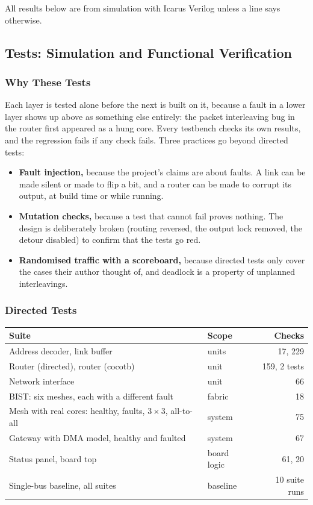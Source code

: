 \documentclass[11pt,a4paper]{article}
\begin{document}
All results below are from simulation with Icarus Verilog unless a line says
otherwise.

\subsection{Tests: Simulation and Functional Verification}

\subsubsection{Why These Tests}

Each layer is tested alone before the next is built on it, because a fault in
a lower layer shows up above as something else entirely: the packet
interleaving bug in the router first appeared as a hung core. Every testbench
checks its own results, and the regression fails if any check fails. Three
practices go beyond directed tests:
\begin{itemize}
\item \textbf{Fault injection,} because the project's claims are about
faults. A link can be made silent or made to flip a bit, and a router can be
made to corrupt its output, at build time or while running.
\item \textbf{Mutation checks,} because a test that cannot fail proves
nothing. The design is deliberately broken (routing reversed, the output lock
removed, the detour disabled) to confirm that the tests go red.
\item \textbf{Randomised traffic with a scoreboard,} because directed tests
only cover the cases their author thought of, and deadlock is a property of
unplanned interleavings.
\end{itemize}

\subsubsection{Directed Tests}

\begin{tabularx}{\textwidth}{@{}Ylr@{}}
\toprule
\textbf{Suite} & \textbf{Scope} & \textbf{Checks} \\
\midrule
Address decoder, link buffer & units & 17, 229 \\
Router (directed), router (cocotb) & unit & 159, 2 tests \\
Network interface & unit & 66 \\
BIST: six meshes, each with a different fault & fabric & 18 \\
Mesh with real cores: healthy, faults, $3\times3$, all-to-all & system & 75 \\
Gateway with DMA model, healthy and faulted & system & 67 \\
Status panel, board top & board logic & 61, 20 \\
Single-bus baseline, all suites & baseline & 10 suite runs \\
\bottomrule
\end{tabularx}
\end{document}
